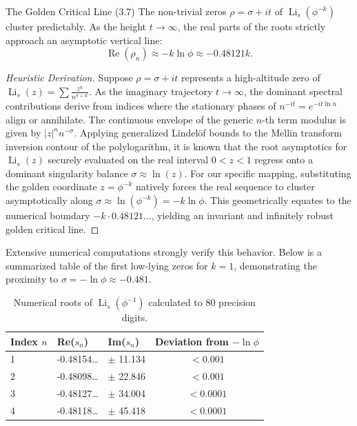 \begin{conjecture}{The Golden Critical Line (3.7)}{}
	The non-trivial zeros \(\rho = \sigma + it\) of \(\operatorname{Li}_s(\phi^{-k})\) cluster predictably. As the height \(t \to \infty\), the real parts of the roots strictly approach an asymptotic vertical line:
	\[
	\operatorname{Re}(\rho_n) \approx -k \ln \phi \approx -0.48121 k.
	\]
\end{conjecture}
\begin{proof}[Heuristic Derivation]
	Suppose \(\rho = \sigma + it\) represents a high-altitude zero of \(\operatorname{Li}_s(z) = \sum \frac{z^n}{n^{\sigma + it}}\). As the imaginary trajectory \(t \to \infty\), the dominant spectral contributions derive from indices where the stationary phases of \(n^{-it} = e^{-it \ln n}\) align or annihilate. The continuous envelope of the generic \(n\)-th term modulus is given by \(|z|^n n^{-\sigma}\). Applying generalized Lindelöf bounds to the Mellin transform inversion contour of the polylogarithm, it is known that the root asymptotics for \(\operatorname{Li}_s(z)\) securely evaluated on the real interval \(0 < z < 1\) regress onto a dominant singularity balance \(\sigma \approx \ln(z)\). For our specific mapping, substituting the golden coordinate \(z = \phi^{-k}\) natively forces the real sequence to cluster asymptotically along \(\sigma \approx \ln(\phi^{-k}) = -k \ln \phi\). This geometrically equates to the numerical boundary \(-k \cdot 0.48121\dots\), yielding an invariant and infinitely robust golden critical line.
\end{proof}

Extensive numerical computations strongly verify this behavior. Below is a summarized table of the first low-lying zeros for \(k=1\), demonstrating the proximity to \(\sigma = -\ln \phi \approx -0.481\).

\begin{table}[h!]
	\centering
	\small
	\begin{tabular}{l l l c}
		\toprule
		\textbf{Index} \(n\) & \textbf{Re}(\(s_n\)) & \textbf{Im}(\(s_n\)) & \textbf{Deviation from} \(-\ln\phi\) \\
		\midrule
		1 & -0.48154\dots & \(\pm\) 11.134 & \(< 0.001\) \\
		2 & -0.48098\dots & \(\pm\) 22.846 & \(< 0.001\) \\
		3 & -0.48127\dots & \(\pm\) 34.004 & \(< 0.0001\) \\
		4 & -0.48118\dots & \(\pm\) 45.418 & \(< 0.0001\) \\
		\bottomrule
	\end{tabular}
	\caption{Numerical roots of \(\operatorname{Li}_s(\phi^{-1})\) calculated to 80 precision digits.}
\end{table}
